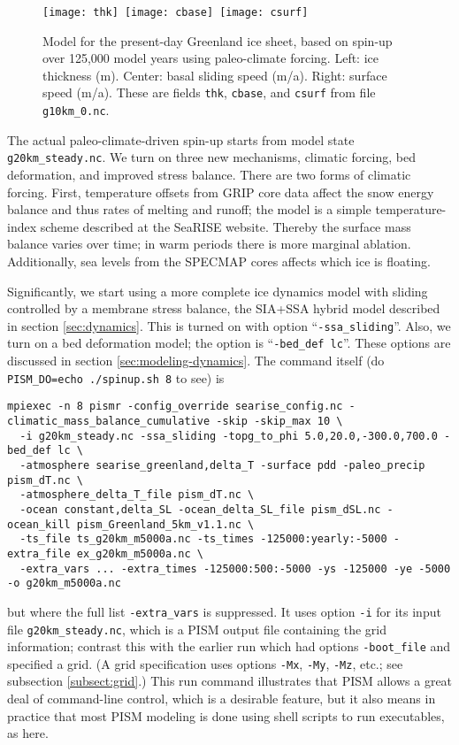 \begin{figure}[ht]
\centering
\mbox{\texttt{[image: thk]}
  \qquad \texttt{[image: cbase]}
  \qquad \texttt{[image: csurf]}}
\caption{Model for the present-day Greenland ice sheet, based on spin-up over 125,000 model years using paleo-climate forcing.  Left: ice thickness (m).  Center: basal sliding speed (m/a).  Right: surface speed (m/a).  These are fields \texttt{thk}, \texttt{cbase}, and \texttt{csurf} from file \texttt{g10km_0.nc}.}
\label{fig:sr-spindone-map}
\end{figure}

The actual paleo-climate-driven spin-up starts from model state \texttt{g20km_steady.nc}.  We turn on three new mechanisms, climatic forcing, bed deformation, and improved stress balance.  There are two forms of climatic forcing. First, temperature offsets from GRIP core data affect the snow energy balance and thus rates of melting and runoff; the model is a simple temperature-index scheme described at the SeaRISE website.  Thereby the surface mass balance varies over time; in warm periods there is more marginal ablation.  Additionally, sea levels from the SPECMAP cores affects which ice is floating.

Significantly, we start using a more complete ice dynamics model with sliding controlled by a membrane stress balance, the SIA+SSA hybrid model described in section \ref{sec:dynamics}.  This is turned on with option ``\texttt{-ssa_sliding}''.  Also, we turn on a bed deformation model; the option is ``\texttt{-bed_def lc}''.  These options are discussed in section \ref{sec:modeling-dynamics}.  The command itself (do \verb|PISM_DO=echo ./spinup.sh 8| to see) is
\small
\begin{verbatim}
mpiexec -n 8 pismr -config_override searise_config.nc -climatic_mass_balance_cumulative -skip -skip_max 10 \
  -i g20km_steady.nc -ssa_sliding -topg_to_phi 5.0,20.0,-300.0,700.0 -bed_def lc \
  -atmosphere searise_greenland,delta_T -surface pdd -paleo_precip pism_dT.nc \
  -atmosphere_delta_T_file pism_dT.nc \
  -ocean constant,delta_SL -ocean_delta_SL_file pism_dSL.nc -ocean_kill pism_Greenland_5km_v1.1.nc \
  -ts_file ts_g20km_m5000a.nc -ts_times -125000:yearly:-5000 -extra_file ex_g20km_m5000a.nc \
  -extra_vars ... -extra_times -125000:500:-5000 -ys -125000 -ye -5000 -o g20km_m5000a.nc
\end{verbatim}
\normalsize
but where the full list \verb|-extra_vars| is suppressed.  It uses option \verb|-i| for its input file \verb|g20km_steady.nc|, which is a PISM output file containing the grid information; contrast this with the earlier run which had options \verb|-boot_file| and specified a grid.   (A grid specification uses options \verb|-Mx|, \verb|-My|, \verb|-Mz|, etc.; see subsection \ref{subsect:grid}.)  This run command illustrates that PISM allows a great deal of command-line control, which is a desirable feature, but it also means in practice that most PISM modeling is done using shell scripts to run executables, as here.

